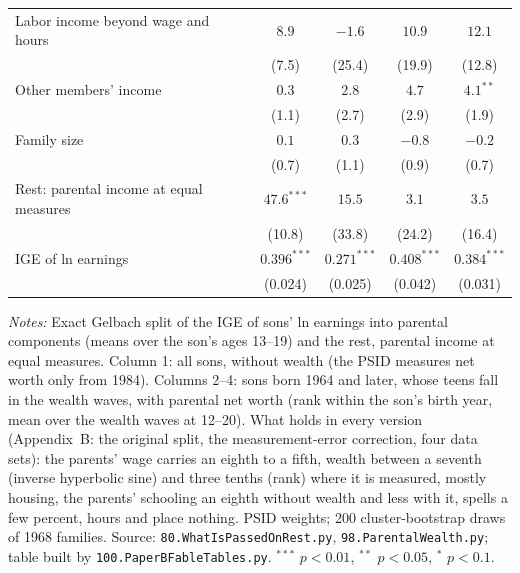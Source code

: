 \begin{table}[!htbp]
{{\begin{tabular}{lcccc}
Labor income beyond wage and hours & $8.9$ & $-1.6$ & $10.9$ & $12.1$ \\
 & (7.5) & (25.4) & (19.9) & (12.8) \\
Other members' income & $0.3$ & $2.8$ & $4.7$ & $4.1^{**}$ \\
 & (1.1) & (2.7) & (2.9) & (1.9) \\
Family size & $0.1$ & $0.3$ & $-0.8$ & $-0.2$ \\
 & (0.7) & (1.1) & (0.9) & (0.7) \\
Rest: parental income at equal measures & $47.6^{***}$ & $15.5$ & $3.1$ & $3.5$ \\
 & (10.8) & (33.8) & (24.2) & (16.4) \\
IGE of ln earnings & $0.396^{***}$ & $0.271^{***}$ & $0.408^{***}$ & $0.384^{***}$ \\
 & (0.024) & (0.025) & (0.042) & (0.031) \\
\bottomrule
\end{tabular}}}
\par\smallskip
\begin{minipage}{\textwidth}\footnotesize \textit{Notes:} Exact Gelbach split of the IGE of sons' ln earnings into parental components (means over the son's ages 13--19) and the rest, parental income at equal measures. Column 1: all sons, without wealth (the PSID measures net worth only from 1984). Columns 2--4: sons born 1964 and later, whose teens fall in the wealth waves, with parental net worth (rank within the son's birth year, mean over the wealth waves at 12--20). What holds in every version (Appendix~B: the original split, the measurement-error correction, four data sets): the parents' wage carries an eighth to a fifth, wealth between a seventh (inverse hyperbolic sine) and three tenths (rank) where it is measured, mostly housing, the parents' schooling an eighth without wealth and less with it, spells a few percent, hours and place nothing. PSID weights; 200 cluster-bootstrap draws of 1968 families. Source: \texttt{80.WhatIsPassedOnRest.py}, \texttt{98.ParentalWealth.py}; table built by \texttt{100.PaperBFableTables.py}. $^{***}$ $p<0.01$, $^{**}$ $p<0.05$, $^{*}$ $p<0.1$.\end{minipage}
\end{table}
